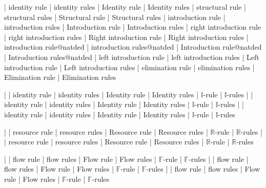  | identity rule
 | identity rules
 | Identity rule
 | Identity rules
 | structural rule
 | structural rules
 | Structural rule
 | Structural rules
 | introduction rule
 | introduction rules
 | Introduction rule
 | Introduction rules
 | right introduction rule
 | right introduction rules
 | Right introduction rule
 | Right introduction rules
 | introduction rule@natded
 | introduction rules@natded
 | Introduction rule@natded
 | Introduction rules@natded
 | left introduction rule
 | left introduction rules
 | Left introduction rule
 | Left introduction rules
 | elimination rule
 | elimination rules
 | Elimination rule
 | Elimination rules

 | \identity
{}
 | identity rule
 | identity rules
 | Identity rule
 | Identity rules
 | $\mathbb{I}$-rule
 | $\mathbb{I}$-rules
 | \identity
{}
 | identity rule
 | identity rules
 | Identity rule
 | Identity rules
 | $\mathbb{I}$-rule
 | $\mathbb{I}$-rules
 | \identity
{}
 | identity rule
 | identity rules
 | Identity rule
 | Identity rules
 | $\mathbb{I}$-rule
 | $\mathbb{I}$-rules

 | \resource
{}
 | resource rule
 | resource rules
 | Resource rule
 | Resource rules
 | $\mathbb{R}$-rule
 | $\mathbb{R}$-rules
 | \resource
{}
 | resource rule
 | resource rules
 | Resource rule
 | Resource rules
 | $\mathbb{R}$-rule
 | $\mathbb{R}$-rules

 | \flow
{}
 | flow rule
 | flow rules
 | Flow rule
 | Flow rules
 | $\mathbb{F}$-rule
 | $\mathbb{F}$-rules
 | \flow
{}
 | flow rule
 | flow rules
 | Flow rule
 | Flow rules
 | $\mathbb{F}$-rule
 | $\mathbb{F}$-rules
 | \flow
{}
 | flow rule
 | flow rules
 | Flow rule
 | Flow rules
 | $\mathbb{F}$-rule
 | $\mathbb{F}$-rules

